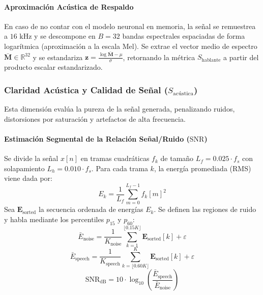 \documentclass[conference]{IEEEtran}
\begin{document}
\paragraph{Aproximación Acústica de Respaldo}
En caso de no contar con el modelo neuronal en memoria, la señal se remuestrea a $16 \text{ kHz}$ y se descompone en $B = 32$ bandas espectrales espaciadas de forma logarítmica (aproximación a la escala Mel). Se extrae el vector medio de espectro $\bar{\mathbf{M}} \in \mathbb{R}^{32}$ y se estandariza $\mathbf{z} = \frac{\log \bar{\mathbf{M}} - \mu}{\sigma}$, retornando la métrica $S_{\text{hablante}}$ a partir del producto escalar estandarizado.

\subsubsection{Claridad Acústica y Calidad de Señal ($S_{\text{acústica}}$)}
Esta dimensión evalúa la pureza de la señal generada, penalizando ruidos, distorsiones por saturación y artefactos de alta frecuencia.

\paragraph{Estimación Segmental de la Relación Señal/Ruido ($\text{SNR}$)}
Se divide la señal $x[n]$ en tramas cuadráticas $f_k$ de tamaño $L_f = 0.025 \cdot f_s$ con solapamiento $L_h = 0.010 \cdot f_s$. Para cada trama $k$, la energía promediada (RMS) viene dada por:
\begin{equation}
	E_k = \frac{1}{L_f} \sum_{m=0}^{L_f-1} f_k[m]^2
\end{equation}
Sea $\mathbf{E}_{\text{sorted}}$ la secuencia ordenada de energías $E_k$. Se definen las regiones de ruido y habla mediante los percentiles $p_{15}$ y $p_{60}$:
\begin{equation}
	\bar{E}_{\text{noise}} = \frac{1}{K_{\text{noise}}} \sum_{k=1}^{\lfloor 0.15 K \rfloor} \mathbf{E}_{\text{sorted}}[k] + \varepsilon
\end{equation}
\begin{equation}		
	\bar{E}_{\text{speech}} = \frac{1}{K_{\text{speech}}} \sum_{k=\lfloor 0.60 K \rfloor}^{K} \mathbf{E}_{\text{sorted}}[k] + \varepsilon
\end{equation}
\begin{equation}
	\text{SNR}_{\text{dB}} = 10 \cdot \log_{10} \left( \frac{\bar{E}_{\text{speech}}}{\bar{E}_{\text{noise}}} \right)
\end{equation}
\end{document}
